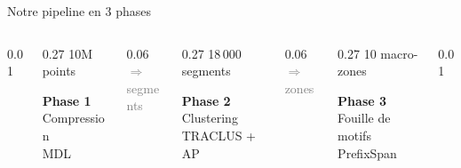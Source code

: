 \documentclass[aspectratio=169, 11pt]{beamer}
\begin{document}
\begin{frame}{Notre pipeline en 3 phases}

\centering
\vspace{0.3cm}

\begin{columns}[c]
\begin{column}{0.01\textwidth}\end{column}
\begin{column}{0.27\textwidth}
    \centering
    {\footnotesize\textcolor{dota_blue}{10M points}}\\[0.15cm]
    \colorbox{dota_blue}{\parbox{0.9\linewidth}{\centering\color{white}\textbf{Phase 1}\\[0.1cm]Compression\\MDL}}
\end{column}
\begin{column}{0.06\textwidth}
    \centering
    {\Large\textcolor{gray}{$\Longrightarrow$}}\\
    {\tiny\textcolor{gray}{segments}}
\end{column}
\begin{column}{0.27\textwidth}
    \centering
    {\footnotesize\textcolor{dota_accent}{18\,000 segments}}\\[0.15cm]
    \colorbox{dota_accent}{\parbox{0.9\linewidth}{\centering\color{white}\textbf{Phase 2}\\[0.1cm]Clustering\\TRACLUS + AP}}
\end{column}
\begin{column}{0.06\textwidth}
    \centering
    {\Large\textcolor{gray}{$\Longrightarrow$}}\\
    {\tiny\textcolor{gray}{zones}}
\end{column}
\begin{column}{0.27\textwidth}
    \centering
    {\footnotesize\textcolor{dota_green!70!black}{10 macro-zones}}\\[0.15cm]
    \colorbox{dota_green!70!black}{\parbox{0.9\linewidth}{\centering\color{white}\textbf{Phase 3}\\[0.1cm]Fouille de motifs\\PrefixSpan}}
\end{column}
\begin{column}{0.01\textwidth}\end{column}
\end{columns}

\vspace{0.6cm}


\end{frame}
\end{document}
